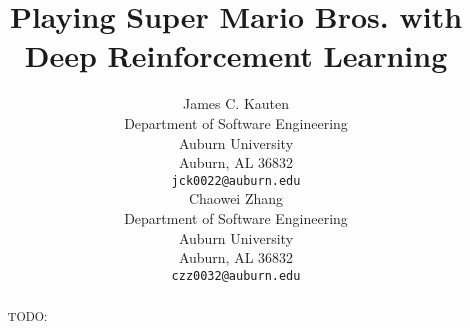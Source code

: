 \title{Playing Super Mario Bros. with Deep Reinforcement Learning}

\author{
	James C. Kauten \\
	Department of Software Engineering \\
	Auburn University \\
	Auburn, AL 36832 \\
	\texttt{jck0022@auburn.edu} \\
	\And
	Chaowei Zhang \\
	Department of Software Engineering \\
	Auburn University \\
	Auburn, AL 36832 \\
	\texttt{czz0032@auburn.edu} \\
}

\maketitle

\begin{abstract}
TODO:
\end{abstract}
